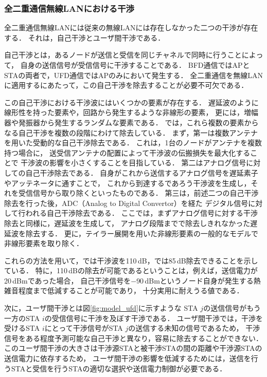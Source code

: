 \documentclass[master]{kuisthesis}		%
\begin{document}
		\subsubsection{全二重通信無線LANにおける干渉}\label{sec:interference}
			全二重通信無線LANには従来の無線LANには存在しなかった二つの干渉が存在する．
			それは，自己干渉とユーザ間干渉である．
			\par
			自己干渉とは，あるノードが送信と受信を同じチャネルで同時に行うことによって，
			自身の送信信号が受信信号に干渉することである．
			BFD通信ではAPとSTAの両者で，UFD通信ではAPのみにおいて発生する．
			全二重通信を無線LANに適用するにあたって，この自己干渉を除去することが必要不可欠である．

			\par
			この自己干渉における干渉波にはいくつかの要素が存在する．
			遅延波のように線形性を持った要素や，回路から発生するような非線形の要素，
			更には，増幅器や発振器から発生するランダムな要素である．
			\cite{stanford1,fdmac}では，これら複数の要素からなる自己干渉を複数の段階にわけて除去している．
			まず，第一は複数アンテナを用いた受動的な自己干渉除去である．
			これは，1台のノードがアンテナを複数持つ場合に，
			送受信アンテナの配置によって干渉波の伝搬損失を最大化することで
			干渉波の影響を小さくすることを目指している．
			第二はアナログ信号に対しての自己干渉除去である．
			自身がこれから送信するアナログ信号を遅延素子やアッテネータに通すことで，
			これから到達するであろう干渉波を生成し，それを受信信号から取り除くといったものである．
			第三は，前述二つの自己干渉除去を行った後，ADC（Analog to Digital Convertor）を経た
			デジタル信号に対して行われる自己干渉除去である．
			ここでは，まずアナログ信号に対する干渉除去と同様に，遅延波を生成して，
			アナログ段階までで除去しきれなかった遅延波を除去する．
			更に，テイラー展開を用いた非線形要素の一般的なモデルで非線形要素を取り除く．

			\par
			これらの方法を用いて，\cite{stanford1}では干渉波を110\,dB，\cite{fdmac}では85\,dB除去できることを示している．
			特に，110\,dBの除去が可能であるということは，例えば，送信電力が20\,dBmであった場合，
			自己干渉信号を$-$90\,dBmというノード自身が発生する熱雑音程度まで低減することが可能であり，
			十分実用に耐えうる値である．
			\par
			次に，ユーザ間干渉とは図\ref{fig:model_ufd}に示すような
			STA $j$の送信信号がもう一方のSTA $i$の受信信号に干渉を及ぼす干渉である．
			ユーザ間干渉では，干渉を受けるSTA $i$にとって干渉信号がSTA $j$の送信する未知の信号であるため，
			干渉信号をある程度予測可能な自己干渉と異なり，容易に除去することができない．
			このユーザ間干渉の大きさは干渉源STAと被干渉STAの間の距離や干渉源STAの送信電力に依存するため，
			ユーザ間干渉の影響を低減するためには，送信を行うSTAと受信を行うSTAの適切な選択や送信電力制御が必要である．
\end{document}
